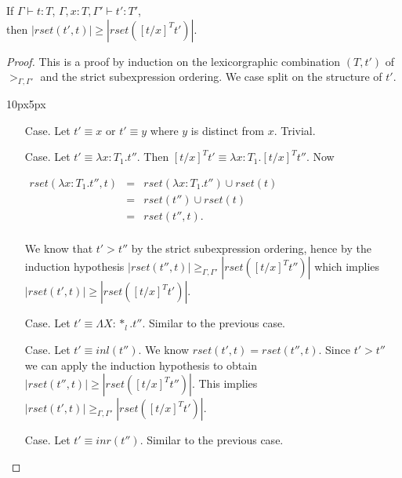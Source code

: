 \begin{lemma}
  \label{lemma:redex_preserving_ssf}
  If $\Gamma \vdash t : T$, $\Gamma, x:T, \Gamma' \vdash t':T'$, \\ then
  $|rset(t', t)| \geq |rset([t/x]^T t')|$.
\end{lemma}
\begin{proof}
  This is a proof by induction on the lexicorgraphic combination
$(T, t')$ of $>_{\Gamma,\Gamma'}$ and the strict subexpression ordering.
We case split on the structure of $t'$. 
\vspace{-25px}
\begin{changemargin}{10px}{5px}\noindent 
\begin{itemize}
\item[Case.] Let $t' \equiv x$ or $t' \equiv y$ where $y$ is distinct from $x$.  Trivial. 
  
\item[Case.] Let $t' \equiv \lambda x:T_1.t''$.  Then $[t/x]^T t' \equiv \lambda x:T_1.[t/x]^T t''$.
  Now 
  \begin{center}
    \begin{math}
      \begin{array}{lll}
        rset(\lambda x:T_1.t'', t) & = & rset(\lambda x:T_1.t'') \cup rset(t)\\
        & = & rset(t'') \cup rset(t)\\
        & = & rset(t'', t).\\
      \end{array}
    \end{math}
  \end{center}
  We know that $t' > t''$ by the strict subexpression ordering, hence by the induction hypothesis
  $|rset(t'', t)| \geq_{\Gamma,\Gamma'} |rset([t/x]^T t'')|$ which implies $|rset(t', t)| \geq |rset([t/x]^T t')|$.
  
\item[Case.] Let $t' \equiv \Lambda X:*_l.t''$.  Similar to the previous case.
  
\item[Case.] Let $t' \equiv inl(t'')$. We know $rset(t', t) = rset(t'', t)$.  Since $t' > t''$ we can apply
  the induction hypothesis to obtain $|rset(t'', t)| \geq |rset([t/x]^T t'')|$.  This implies
  $|rset(t', t)| \geq_{\Gamma,\Gamma'} |rset([t/x]^T t')|$.
  
\item[Case.] Let $t' \equiv inr(t'')$. Similar to the previous case.
  

\end{itemize}
\end{changemargin}
\end{proof}
